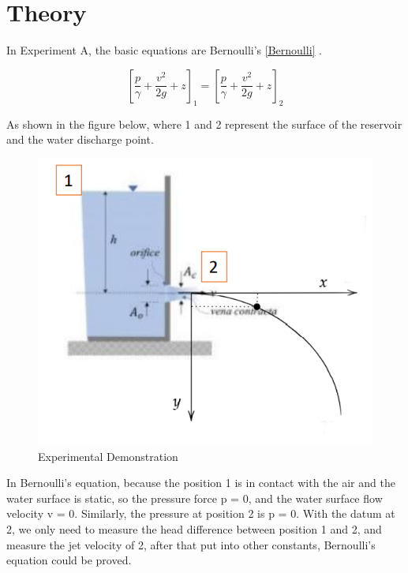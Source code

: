 \section{Theory}
In Experiment A, the basic equations are Bernoulli's \eqref{Bernoulli} .

\begin{equation}
\label{Bernoulli}
\left[ \frac{p}{\gamma}+\frac{v^2}{2g}+z \right]_1 = 
\left[ \frac{p}{\gamma}+\frac{v^2}{2g}+z \right]_2 
\end{equation}

As shown in the figure below, where 1 and 2 represent the surface of 
the reservoir and the water discharge point.

\begin{figure}[htb] %
    \centering
    \includegraphics[scale=0.45]{Theory/figures/figure1.png}
    \caption{Experimental Demonstration}
    \label{fig:demo}
\end{figure}

In Bernoulli's equation, because the position 1 is in contact with the air and the water surface is static, 
so the pressure force p = 0, and the water surface flow velocity v = 0. 
Similarly, the pressure at position 2 is p = 0. 
With the datum at 2, we only need to measure the head difference between position 1 and 2, 
and measure the jet velocity of 2, after that put into other constants, 
Bernoulli's equation could be proved.










